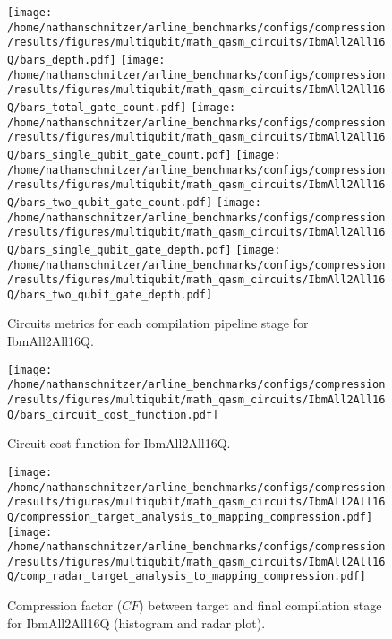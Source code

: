 \documentclass{report}%
\begin{document}
\begin{figure}[h!]%
\centering%
\texttt{[image: /home/nathanschnitzer/arline\_benchmarks/configs/compression/results/figures/multiqubit/math\_qasm\_circuits/IbmAll2All16Q/bars\_depth.pdf]}%
\centering%
\texttt{[image: /home/nathanschnitzer/arline\_benchmarks/configs/compression/results/figures/multiqubit/math\_qasm\_circuits/IbmAll2All16Q/bars\_total\_gate\_count.pdf]}%
\linebreak%
\centering%
\texttt{[image: /home/nathanschnitzer/arline\_benchmarks/configs/compression/results/figures/multiqubit/math\_qasm\_circuits/IbmAll2All16Q/bars\_single\_qubit\_gate\_count.pdf]}%
\centering%
\texttt{[image: /home/nathanschnitzer/arline\_benchmarks/configs/compression/results/figures/multiqubit/math\_qasm\_circuits/IbmAll2All16Q/bars\_two\_qubit\_gate\_count.pdf]}%
\linebreak%
\centering%
\texttt{[image: /home/nathanschnitzer/arline\_benchmarks/configs/compression/results/figures/multiqubit/math\_qasm\_circuits/IbmAll2All16Q/bars\_single\_qubit\_gate\_depth.pdf]}%
\centering%
\texttt{[image: /home/nathanschnitzer/arline\_benchmarks/configs/compression/results/figures/multiqubit/math\_qasm\_circuits/IbmAll2All16Q/bars\_two\_qubit\_gate\_depth.pdf]}%
\linebreak%
\caption{Circuits metrics for each compilation pipeline stage for IbmAll2All16Q.}%
\end{figure}

%


\begin{figure}[h!]%
\centering%
\texttt{[image: /home/nathanschnitzer/arline\_benchmarks/configs/compression/results/figures/multiqubit/math\_qasm\_circuits/IbmAll2All16Q/bars\_circuit\_cost\_function.pdf]}%
\caption{Circuit cost function for IbmAll2All16Q.}%
\end{figure}

%


\begin{figure}[h!]%
\centering%
\texttt{[image: /home/nathanschnitzer/arline\_benchmarks/configs/compression/results/figures/multiqubit/math\_qasm\_circuits/IbmAll2All16Q/compression\_target\_analysis\_to\_mapping\_compression.pdf]}%
\centering%
\texttt{[image: /home/nathanschnitzer/arline\_benchmarks/configs/compression/results/figures/multiqubit/math\_qasm\_circuits/IbmAll2All16Q/comp\_radar\_target\_analysis\_to\_mapping\_compression.pdf]}%
\caption{Compression factor ($CF$) between target and final compilation stage for IbmAll2All16Q
                        (histogram and radar plot).
                        }%
\end{figure}
\end{document}
